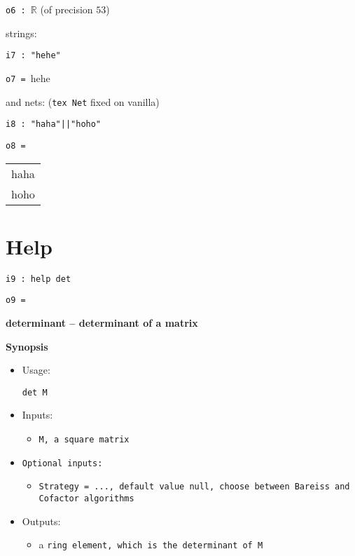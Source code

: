 \documentclass[12pt,a4paper]{amsart}
\begin{document}
\noindent\verb|o6 : |${\mathbb R}$ (of precision $ 53$)
\smallskip

strings:
\smallskip
\begin{verbatim}
i7 : "hehe"
\end{verbatim}
\noindent\verb|o7 = |hehe
\smallskip

and nets: ({\tt tex Net} fixed on vanilla)
\smallskip
\begin{verbatim}
i8 : "haha"||"hoho"
\end{verbatim}
\noindent\verb|o8 = |\begin{tabular}[t]{l}haha\\
hoho\end{tabular}
\smallskip


\section{Help}
\smallskip
\begin{verbatim}
i9 : help det
\end{verbatim}
\noindent\verb|o9 = |
\par \medskip\noindent\begingroup\Large\bf
determinant -- determinant of a matrix\endgroup
\par \smallskip%

\par \medskip\noindent\begingroup\Large\bf
Synopsis\endgroup
\par \smallskip%
\begin{itemize}
\item 
\par Usage: 
\par \begingroup\tt det\ M\endgroup{}
\item Inputs:\begin{itemize}
\item \begingroup\tt M\endgroup{}, a square \begingroup\tt matrix\endgroup{}
\end{itemize}

\item \begingroup\tt Optional\ inputs\endgroup{}:\begin{itemize}
\item \begingroup\tt Strategy\endgroup{}\begingroup\tt \ ={}\ \endgroup{}\begingroup\tt ...\endgroup{}, default value null, choose between Bareiss and Cofactor algorithms
\end{itemize}

\item Outputs:\begin{itemize}
\item a \begingroup\tt ring\ element\endgroup{}, which is the determinant of \begingroup\tt M\endgroup{}
\end{itemize}

\end{itemize}
\end{document}
